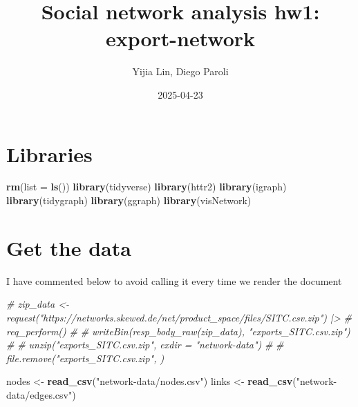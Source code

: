 \documentclass[
]{article}
\title{Social network analysis hw1: export-network}
\author{Yijia Lin, Diego Paroli}
\date{2025-04-23}
\newenvironment{Shaded}{\begin{snugshade}}{\end{snugshade}}
\newcommand{\AttributeTok}[1]{\textcolor[rgb]{0.13,0.29,0.53}{#1}}
\newcommand{\CommentTok}[1]{\textcolor[rgb]{0.56,0.35,0.01}{\textit{#1}}}
\newcommand{\FunctionTok}[1]{\textcolor[rgb]{0.13,0.29,0.53}{\textbf{#1}}}
\newcommand{\NormalTok}[1]{#1}
\newcommand{\OtherTok}[1]{\textcolor[rgb]{0.56,0.35,0.01}{#1}}
\newcommand{\StringTok}[1]{\textcolor[rgb]{0.31,0.60,0.02}{#1}}
\begin{document}
\maketitle

\section{Libraries}\label{libraries}

\begin{Shaded}
\begin{Highlighting}[]
\FunctionTok{rm}\NormalTok{(}\AttributeTok{list =} \FunctionTok{ls}\NormalTok{())}
\FunctionTok{library}\NormalTok{(tidyverse)}
\FunctionTok{library}\NormalTok{(httr2)}
\FunctionTok{library}\NormalTok{(igraph)}
\FunctionTok{library}\NormalTok{(tidygraph)}
\FunctionTok{library}\NormalTok{(ggraph)}
\FunctionTok{library}\NormalTok{(visNetwork)}
\end{Highlighting}
\end{Shaded}

\section{Get the data}\label{get-the-data}

I have commented below to avoid calling it every time we render the
document

\begin{Shaded}
\begin{Highlighting}[]
\CommentTok{\# zip\_data \textless{}{-} request("https://networks.skewed.de/net/product\_space/files/SITC.csv.zip") |\textgreater{}}
\CommentTok{\#   req\_perform()}
\CommentTok{\# }
\CommentTok{\# writeBin(resp\_body\_raw(zip\_data), "exports\_SITC.csv.zip")}
\CommentTok{\# }
\CommentTok{\# unzip("exports\_SITC.csv.zip", exdir = "network{-}data")}
\CommentTok{\# }
\CommentTok{\# file.remove("exports\_SITC.csv.zip", )}
\end{Highlighting}
\end{Shaded}

\begin{Shaded}
\begin{Highlighting}[]
\NormalTok{nodes }\OtherTok{\textless{}{-}} \FunctionTok{read\_csv}\NormalTok{(}\StringTok{"network{-}data/nodes.csv"}\NormalTok{)}
\NormalTok{links }\OtherTok{\textless{}{-}} \FunctionTok{read\_csv}\NormalTok{(}\StringTok{"network{-}data/edges.csv"}\NormalTok{)}
\end{Highlighting}
\end{Shaded}
\end{document}
